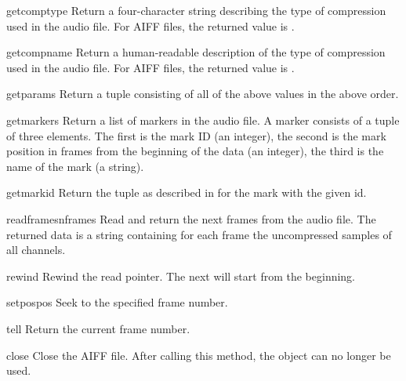 \begin{funcdesc}{getcomptype}{}
Return a four-character string describing the type of compression used
in the audio file.  For AIFF files, the returned value is
.
\end{funcdesc}

\begin{funcdesc}{getcompname}{}
Return a human-readable description of the type of compression used in
the audio file.  For AIFF files, the returned value is .
\end{funcdesc}

\begin{funcdesc}{getparams}{}
Return a tuple consisting of all of the above values in the above
order.
\end{funcdesc}

\begin{funcdesc}{getmarkers}{}
Return a list of markers in the audio file.  A marker consists of a
tuple of three elements.  The first is the mark ID (an integer), the
second is the mark position in frames from the beginning of the data
(an integer), the third is the name of the mark (a string).
\end{funcdesc}

\begin{funcdesc}{getmark}{id}
Return the tuple as described in  for the mark with
the given id.
\end{funcdesc}

\begin{funcdesc}{readframes}{nframes}
Read and return the next  frames from the audio file.  The
returned data is a string containing for each frame the uncompressed
samples of all channels.
\end{funcdesc}

\begin{funcdesc}{rewind}{}
Rewind the read pointer.  The next  will start from
the beginning.
\end{funcdesc}

\begin{funcdesc}{setpos}{pos}
Seek to the specified frame number.
\end{funcdesc}

\begin{funcdesc}{tell}{}
Return the current frame number.
\end{funcdesc}

\begin{funcdesc}{close}{}
Close the AIFF file.  After calling this method, the object can no
longer be used.
\end{funcdesc}

